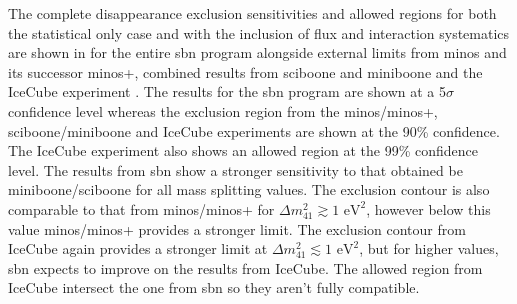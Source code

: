 The complete \numu disappearance exclusion sensitivities and allowed regions for both the statistical only case and with the inclusion of flux and interaction systematics are shown in  for the entire \gls{sbn} program alongside external limits from \gls{minos} and its successor \gls{minos}+, combined results from \gls{sciboone} and \gls{miniboone} and the IceCube experiment \cite{MINOS+} \cite{MiniBooNE/SciBooNE_numu_disapp_contour} \cite{IceCube_numu_disapp_contour}. The results for the \gls{sbn} program are shown at a 5$\sigma$ confidence level whereas the exclusion region from the \gls{minos}/\gls{minos}+, \gls{sciboone}/\gls{miniboone} and IceCube experiments are shown at the 90\% confidence. The IceCube experiment also shows an allowed region at the 99\% confidence level. The results from \gls{sbn} show a stronger sensitivity to that obtained be \gls{miniboone}/\gls{sciboone} for all mass splitting values. The exclusion contour is also comparable to that from \gls{minos}/\gls{minos}+ for $\Delta m^2_{41} \gtrsim 1\text{ eV}^2$, however below this value \gls{minos}/\gls{minos}+ provides a stronger limit. The exclusion contour from IceCube again provides a stronger limit at $\Delta m^2_{41} \lesssim 1\text{ eV}^2$, but for higher values, \gls{sbn} expects to improve on the results from IceCube. The allowed region from IceCube intersect the one from \gls{sbn} so they aren't fully compatible. 

